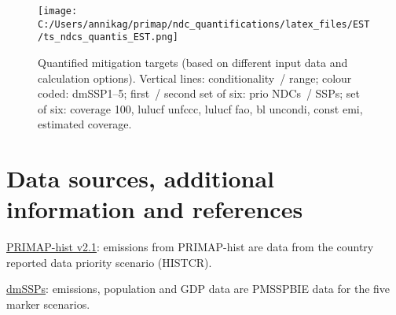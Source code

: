 \documentclass[12pt]{article}
\begin{document}
 \begin{figure}[H]
 \centering
 \texttt{[image: C:/Users/annikag/primap/ndc\_quantifications/latex\_files/EST/ts\_ndcs\_quantis\_EST.png]}
 \caption{Quantified mitigation targets (based on different input data and calculation options).
 Vertical lines: conditionality~/ range;
 colour coded: dmSSP1--5;
 first~/ second set of six: prio NDCs~/ SSPs;
 set of six: coverage 100, lulucf unfccc, lulucf fao, bl uncondi, const emi, estimated coverage.}
 \label{fig:miti}
 \end{figure}

 \newpage %
 \section{Data sources, additional information and references}
 \label{sec:dataSourcesRefs}

 \noindent \href{https://dataservices.gfz-potsdam.de/pik/showshort.php?id=escidoc:4736895}{PRIMAP-hist v2.1}: emissions from PRIMAP-hist are data from the country reported data priority scenario (HISTCR).

 \noindent \href{https://zenodo.org/record/3638137#.X2syXouxU2w}{dmSSPs}: emissions, population and GDP data are PMSSPBIE data for the five marker scenarios.
\end{document}
